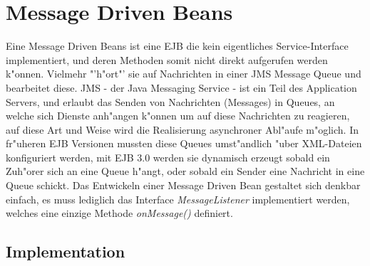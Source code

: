 \section{Message Driven Beans}
\label{sec:chap2:mdb}

Eine Message Driven Beans ist eine EJB die kein eigentliches Service-Interface implementiert,
und deren Methoden somit nicht direkt aufgerufen werden k"onnen. Vielmehr "'h"ort"' sie auf
Nachrichten in einer JMS Message Queue und bearbeitet diese.  JMS - der Java Messaging Service - 
ist ein Teil des Application Servers, und erlaubt das Senden von Nachrichten (Messages) in
Queues, an welche sich Dienste anh"angen k"onnen um auf diese Nachrichten zu reagieren,
auf diese Art und Weise wird die Realisierung asynchroner Abl"aufe m"oglich.
In fr"uheren EJB Versionen mussten diese Queues umst"andlich "uber XML-Dateien konfiguriert werden,
mit EJB 3.0 werden sie dynamisch erzeugt sobald ein Zuh"orer sich an eine Queue h"angt, oder
sobald ein Sender eine Nachricht in eine Queue schickt. Das Entwickeln einer Message Driven Bean 
gestaltet sich denkbar einfach, es muss lediglich das Interface \emph{MessageListener} implementiert
werden, welches eine einzige Methode \emph{onMessage()} definiert.

\subsection{Implementation}
\label{sec:chap2:mdb:impl}

